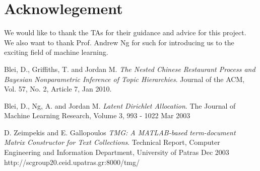 \documentclass[DIV=calc, paper=a4, fontsize=11pt, twocolumn]{scrartcl}	 %
\begin{document}
\section*{Acknowlegement}
We would like to thank the TAs for their guidance and advice for this project. We also want to thank Prof. Andrew Ng for such for introducing us to the exciting field of machine learning.  

\begin{thebibliography}{99}

  Blei, D., Griffiths, T. and Jordan M.
  \emph{The Nested Chinese Restaurant Process and Bayesian Nonparametric Inference of Topic Hierarchies}.
  Journal of the ACM, Vol. 57, No. 2, Article 7,
 Jan 2010.
 
  Blei, D., Ng, A. and Jordan M.
  \emph{Latent Dirichlet Allocation}.
  The Journal of Machine Learning Research,
 Volume 3, 993 - 1022
 Mar 2003
 
  D. Zeimpekis and E. Gallopoulos
  \emph{TMG: A MATLAB-based term-document Matrix Constructor for Text Collections}.
  Technical Report, Computer Engineering and Information Department, University of Patras
  Dec 2003
  http://scgroup20.ceid.upatras.gr:8000/tmg/

\end{thebibliography}
\end{document}

